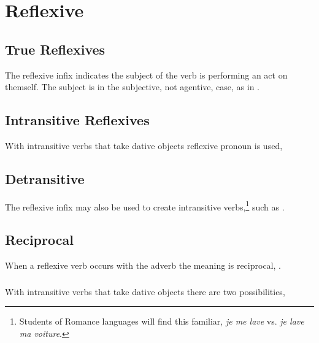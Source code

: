 \section{Reflexive}
\subsection{True Reflexives} The reflexive infix 
indicates the subject of the verb is performing an act on themself.
The subject is in the subjective, not agentive, case, as in  .

\subsection{Intransitive Reflexives} With intransitive verbs that take
dative objects reflexive pro\-noun  is used,

\begin{quotation}
\noindent{} 
\end{quotation} 
\noindent {}

\subsection{Detransitive} The reflexive infix may also be used to
create intransitive verbs,\footnote{Students of Romance languages will
find this familiar, \textit{je me lave} vs. \textit{je lave ma
voiture}.} such as  .

\subsection{Reciprocal} When a reflexive verb occurs with the adverb
  the meaning is reciprocal,  .

\subsubsection{} With intransitive verbs that take dative objects
there are two possibilities,

